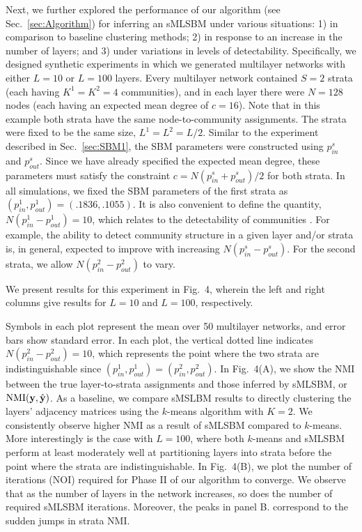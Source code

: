 {Next, we further explored the performance of our algorithm (see Sec.~\ref{sec:Algorithm}) for inferring an sMLSBM under various situations: 1) in comparison to baseline clustering methods; 2) in response to an increase in the number of layers; and 3) under variations in levels of detectability. Specifically, we designed synthetic experiments in which we generated multilayer networks with either $L=10$ or $L=100$ layers. Every multilayer network contained $S=2$ strata (each having $K^1=K^2=4$ communities), and in each layer there were $N=128$ nodes (each having an expected mean degree of $c=16$). Note that in this example both strata have the same node-to-community assignments. The strata were fixed to be the same size, $L^1=L^2=L/2$. Similar to the experiment described in Sec.~\ref{sec:SBM1}, the SBM parameters were constructed using $p_{in}^s$ and $p_{out}^s$. Since we have already specified the expected mean degree, these parameters must satisfy the constraint $c=N(p_{in}^s+p_{out}^s)/2$ for both strata.
%
In all simulations, we fixed the SBM parameters of the first strata as $(p_{in}^1,p_{out}^1)=(.1836,.1055)$. It is also convenient to define the quantity, $N(p_{{in}}^{1}-p_{{out}}^{1})=10$, which relates to the detectability of communities \cite{decelle2011inference}. For example, the ability to detect community structure in a given layer and/or strata is, in general, expected to improve with increasing $N(p_{{in}}^{s}-p_{{out}}^{s})$. For the second strata, we allow $N(p_{{in}}^{2}-p_{{out}}^{2})$ to vary.


We present results for this experiment in Fig.~4, wherein the left and right columns give results for $L=10$ and $L=100$, respectively.

Symbols in each plot represent the mean over 50 multilayer networks, and error bars show standard error. In each plot, the vertical dotted line indicates $N(p_{{in}}^{2}-p_{{out}}^{2})=10$, which represents the point where the two strata are indistinguishable since $(p_{in}^1,p_{out}^1)=(p_{in}^2,p_{out}^2)$.
%
In Fig.~4(A), we show the NMI between the true layer-to-strata assignments and those inferred by sMLSBM, or $\text{NMI}({\bf y},\hat{\bf y})$. As a baseline, we compare sMSLBM results to directly clustering the layers' adjacency matrices using the $k$-means algorithm with $K=2$. We consistently observe higher NMI as a result of sMLSBM compared to $k$-means. More interestingly is the case with $L=100$, where both $k$-means and sMLSBM perform at least moderately well at partitioning layers into strata before the point where the strata are indistinguishable. %
%
In Fig.~4(B), we plot the number of iterations (NOI) required for Phase II of our algorithm to converge. We observe that as the number of layers in the network increases, so does the number of required sMLSBM iterations. Moreover, the peaks in panel B. correspond to the sudden jumps in strata NMI. 

}
